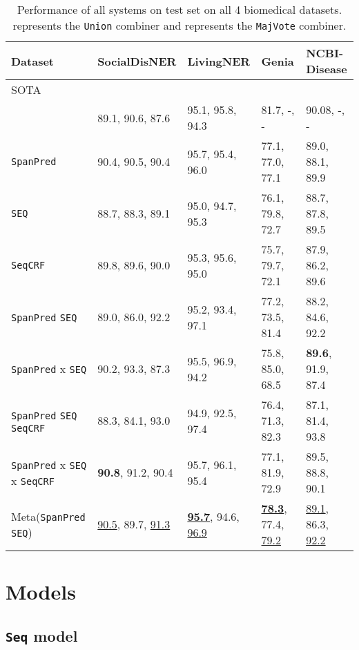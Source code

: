 \documentclass[11pt]{article}
\begin{document}
\begin{table*}[t]
  \centering
\begin{tabular}{|l|l|l|l|l|}
\hline
Dataset & SocialDisNER & LivingNER & Genia & NCBI-Disease \\ \hline
SOTA & \cite{fu-etal-2022-casia-smm4h22} & \cite{vicomtech} & \cite{shen-etal-2022-parallel} & \cite{tian2020improving} \\ \hline
 & 89.1, 90.6, 87.6 & 95.1, 95.8, 94.3 &  81.7, -, - & 90.08, -, - \\ \hline
\texttt{SpanPred} & 90.4, 90.5, 90.4 & 95.7, 95.4, 96.0 & 77.1, 77.0, 77.1 & 89.0, 88.1, 89.9 \\ \hline
\texttt{SEQ} & 88.7, 88.3, 89.1 & 95.0, 94.7, 95.3 & 76.1, 79.8, 72.7 & 88.7, 87.8, 89.5 \\ \hline
\texttt{SeqCRF} & 89.8, 89.6, 90.0 & 95.3, 95.6, 95.0 & 75.7, 79.7, 72.1 & 87.9, 86.2, 89.6 \\ \hline
\texttt{SpanPred}  \texttt{SEQ} & 89.0, 86.0, 92.2 & 95.2, 93.4, 97.1 & 77.2, 73.5, 81.4 & 88.2, 84.6, 92.2 \\ \hline
\texttt{SpanPred} x \texttt{SEQ} & 90.2, 93.3, 87.3 & 95.5, 96.9, 94.2 & 75.8, 85.0, 68.5 & \textbf{89.6}, 91.9, 87.4 \\ \hline
\texttt{SpanPred}  \texttt{SEQ}  \texttt{SeqCRF} & 88.3, 84.1, 93.0 & 94.9, 92.5, 97.4 & 76.4, 71.3, 82.3 & 87.1, 81.4, 93.8 \\ \hline
\texttt{SpanPred} x \texttt{SEQ} x \texttt{SeqCRF} & \textbf{90.8}, 91.2, 90.4 & 95.7, 96.1, 95.4 & 77.1, 81.9, 72.9 & 89.5, 88.8, 90.1 \\ \hline
Meta(\texttt{SpanPred}  \texttt{SEQ}) & \underline{90.5}, 89.7, \underline{91.3} & \underline{\textbf{95.7}}, 94.6, \underline{96.9} & \underline{\textbf{78.3}}, 77.4, \underline{79.2} & \underline{89.1}, 86.3, \underline{92.2} \\ \hline
\end{tabular}  

\caption{Performance of all systems on test set on all 4 biomedical datasets.  represents the \texttt{Union} combiner and  represents the \texttt{MajVote} combiner.}
  \label{tab:principle}
\end{table*}


\section{Models} \label{models} 


\subsection{\texttt{Seq} model} 
\end{document}

